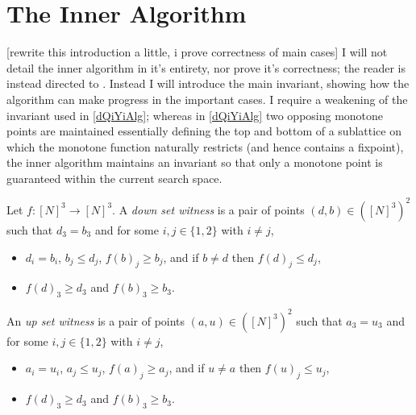 \section{The Inner Algorithm}
[rewrite this introduction a little, i prove correctness of main cases]
I will not detail the inner algorithm in it's entirety, nor prove it's correctness;
the reader is instead directed to \citep{fasterTarski}. Instead I will introduce
the main invariant, showing how the algorithm can make progress in the important 
cases. I require a weakening of the invariant used in \cref{dQiYiAlg}; whereas
in \cref{dQiYiAlg} two opposing monotone points are maintained essentially
defining the top and bottom of a sublattice on which the monotone function
naturally restricts (and hence contains a fixpoint), 
the inner algorithm maintains an invariant so that only a monotone point is guaranteed
within the current search space.
\begin{definition} \label{witnessDef}
  Let $f : [N]^3 \to [N]^3$. A \emph{down set witness} is a pair of points
  $(d, b) \in ([N]^3)^2$ such that $d_3 = b_3$ and for some $i, j \in \{1, 2\}$
  with $i \neq j$,
  \begin{itemize}
    \item $d_i = b_i$, $b_j \leq d_j$, $f(b)_j \geq b_j$, and if $b \neq d$ then $f(d)_j \leq d_j$,
    \item $f(d)_3 \geq d_3$ and $f(b)_3 \geq b_3$.
  \end{itemize}
  An \emph{up set witness} is a pair of points
  $(a, u) \in ([N]^3)^2$ such that $a_3 = u_3$ and for some $i, j \in \{1, 2\}$
  with $i \neq j$,
  \begin{itemize}
    \item $a_i = u_i$, $a_j \leq u_j$, $f(a)_j \geq a_j$, and if $u \neq a$ then $f(u)_j \leq u_j$,
    \item $f(d)_3 \geq d_3$ and $f(b)_3 \geq b_3$.
  \end{itemize}
\end{definition}

